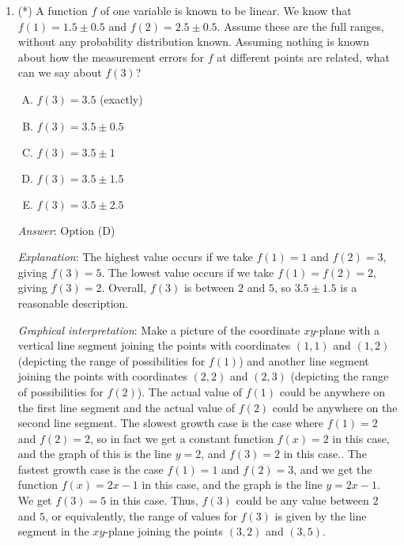 \documentclass[10pt]{amsart}
\begin{document}
\begin{enumerate}
  {\em Note on subtle difference in goals from previous situations}:
  See the note at the end of the answer to Question 2.

  {\em Performance review}: 19 out of 29 got this. 5 chose (B), 3
  chose (E), 2 chose (C).

  {\em Historical note (last time)}: $12$ out of $29$ got this. $14$
  chose (B), $2$ chose (C), $1$ chose (A).

  \vspace{0.1in}

  The next few questions are framed deterministically, though similar
  real-world applications would be probabilistic, with some square
  roots floating around. Unfortunately, we do not have the tools yet
  to deal with the probabilistic versions of the questions.

\item (*) A function $f$ of one variable is known to be linear. We know
  that $f(1) = 1.5 \pm 0.5$ and $f(2) = 2.5 \pm 0.5$. Assume these are
  the full ranges, without any probability distribution known. Assuming
  nothing is known about how the measurement errors for $f$ at
  different points are related, what can we say about $f(3)$?

  \begin{enumerate}[(A)]
  \item $f(3) = 3.5$ (exactly)
  \item $f(3) = 3.5 \pm 0.5$
  \item $f(3) = 3.5 \pm 1$
  \item $f(3) = 3.5 \pm 1.5$
  \item $f(3) = 3.5 \pm 2.5$
  \end{enumerate}

  {\em Answer}: Option (D)

  {\em Explanation}: The highest value occurs if we take $f(1) = 1$
  and $f(2) = 3$, giving $f(3) = 5$. The lowest value occurs if we
  take $f(1) = f(2) = 2$, giving $f(3) = 2$. Overall, $f(3)$ is
  between $2$ and $5$, so $3.5 \pm 1.5$ is a reasonable description.

  {\em Graphical interpretation}: Make a picture of the coordinate
  $xy$-plane with a vertical line segment joining the points with
  coordinates $(1,1)$ and $(1,2)$ (depicting the range of
  possibilities for $f(1)$) and another line segment joining the
  points with coordinates $(2,2)$ and $(2,3)$ (depicting the range of
  possibilities for $f(2)$). The actual value of $f(1)$ could be
  anywhere on the first line segment and the actual value of $f(2)$
  could be anywhere on the second line segment. The slowest growth
  case is the case where $f(1) = 2$ and $f(2) = 2$, so in fact we get
  a constant function $f(x) = 2$ in this case, and the graph of this
  is the line $y = 2$, and $f(3) = 2$ in this case.. The fastest
  growth case is the case $f(1) = 1$ and $f(2) = 3$, and we get the
  function $f(x) = 2x - 1$ in this case, and the graph is the line $y
  = 2x - 1$. We get $f(3) = 5$ in this case. Thus, $f(3)$ could be any
  value between $2$ and $5$, or equivalently, the range of values for
  $f(3)$ is given by the line segment in the $xy$-plane joining the
  points $(3,2)$ and $(3,5)$.


\end{enumerate}
\end{document}
